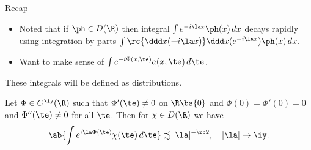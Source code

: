 Recap
\begin{itemize}
\item
Noted that if $\ph\in D(\R)$ then integral $\int e^{-i\la x}\ph(x)\,dx$ decays rapidly using integration by parts $\int\rc{\ddd x(-i\la x)}\ddd x(e^{-i\la x})\ph(x)\,dx$. 
\item Want to make sense of $\int e^{-i\Phi (x,\te)}a(x,\te)\,d\te$.
\end{itemize}
These integrals will be defined as distributions.
\begin{lem}
Let $\Phi\in C^{\iy}(\R)$ such that $\Phi'(\te)\ne 0$ on $\R\bs \{0\}$ and $\Phi(0)=\Phi'(0)=0$ and $\Phi''(\te)\ne 0$ for all $\te$. Then for $\chi\in D(\R)$ we have
\[
\ab{
\int e^{i\la \Phi(\te)}\chi(\te)\,d\te
}\precsim |\la|^{-\rc 2},\quad |\la|\to \iy.
\]
\end{lem}
